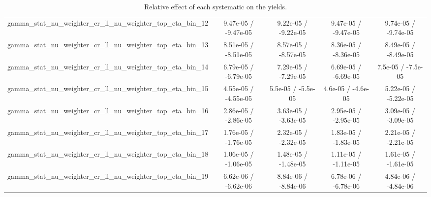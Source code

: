 \documentclass[10pt]{article}
\begin{document}
\begin{table}[htbp]
\begin{center}
\begin{tabular}{|c|c|c|c|c|}
  gamma_stat_nu_weighter_cr_ll_nu_weighter_top_eta_bin_12 & 9.47e-05 / -9.47e-05 & 9.22e-05 / -9.22e-05 & 9.47e-05 / -9.47e-05 & 9.74e-05 / -9.74e-05 \\ 
  gamma_stat_nu_weighter_cr_ll_nu_weighter_top_eta_bin_13 & 8.51e-05 / -8.51e-05 & 8.57e-05 / -8.57e-05 & 8.36e-05 / -8.36e-05 & 8.49e-05 / -8.49e-05 \\ 
  gamma_stat_nu_weighter_cr_ll_nu_weighter_top_eta_bin_14 & 6.79e-05 / -6.79e-05 & 7.29e-05 / -7.29e-05 & 6.69e-05 / -6.69e-05 & 7.5e-05 / -7.5e-05 \\ 
  gamma_stat_nu_weighter_cr_ll_nu_weighter_top_eta_bin_15 & 4.55e-05 / -4.55e-05 & 5.5e-05 / -5.5e-05 & 4.6e-05 / -4.6e-05 & 5.22e-05 / -5.22e-05 \\ 
  gamma_stat_nu_weighter_cr_ll_nu_weighter_top_eta_bin_16 & 2.86e-05 / -2.86e-05 & 3.63e-05 / -3.63e-05 & 2.95e-05 / -2.95e-05 & 3.09e-05 / -3.09e-05 \\ 
  gamma_stat_nu_weighter_cr_ll_nu_weighter_top_eta_bin_17 & 1.76e-05 / -1.76e-05 & 2.32e-05 / -2.32e-05 & 1.83e-05 / -1.83e-05 & 2.21e-05 / -2.21e-05 \\ 
  gamma_stat_nu_weighter_cr_ll_nu_weighter_top_eta_bin_18 & 1.06e-05 / -1.06e-05 & 1.48e-05 / -1.48e-05 & 1.11e-05 / -1.11e-05 & 1.61e-05 / -1.61e-05 \\ 
  gamma_stat_nu_weighter_cr_ll_nu_weighter_top_eta_bin_19 & 6.62e-06 / -6.62e-06 & 8.84e-06 / -8.84e-06 & 6.78e-06 / -6.78e-06 & 4.84e-06 / -4.84e-06 \\ 
\hline 
\end{tabular} 
\caption{Relative effect of each systematic on the yields.} 
\end{center} 
\end{table} 
\end{document}
